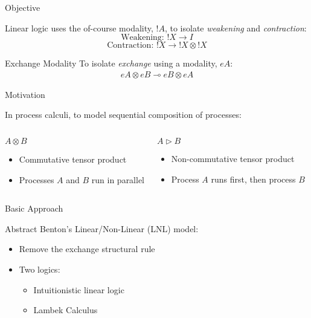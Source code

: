 \documentclass{beamer}
\begin{document}
\begin{frame}{Objective}

Linear logic uses the of-course modality, $!A$, to isolate
\textit{weakening} and \textit{contraction}:
$$\mbox{Weakening: }!X \rightarrow I$$
$$\mbox{Contraction: }!X \rightarrow !X \otimes !X$$

\begin{block}{Exchange Modality}
To isolate \textit{exchange} using a modality, $eA$:
\begin{gather*}
eA\otimes eB\multimap eB\otimes eA
\end{gather*}
\end{block}

\end{frame}


\begin{frame}{Motivation}

In process calculi, to model sequential composition of processes:

\begin{columns}
  \begin{block}{$A\otimes B$}
  \begin{itemize}
  \item Commutative tensor product
  \item Processes $A$ and $B$ run in parallel
  \end{itemize}
  \end{block}
  \begin{block}{$A\triangleright B$}
  \begin{itemize}
  \item Non-commutative tensor product
  \item Process $A$ runs first, then process $B$
  \end{itemize}
  \end{block}
\end{columns}

\end{frame}

\begin{frame}{Basic Approach}

Abstract Benton's Linear/Non-Linear (LNL) model:
\begin{itemize}
\item Remove the exchange structural rule
\item Two logics:
      \begin{itemize}
      \item Intuitionistic linear logic
      \item Lambek Calculus
      \end{itemize}
\end{itemize}

\end{frame}
\end{document}

